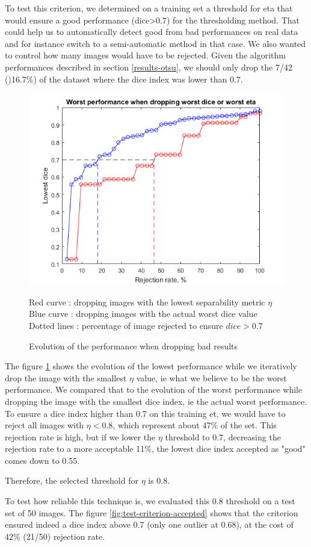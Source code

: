 \documentclass[a4paper,10pt]{article}
\begin{document}
To test this criterion, we determined on a training set a threshold for eta that would ensure a good performance (dice>0.7) for the thresholding method. That could help us to automatically detect good from bad performances on real data and for instance switch to a semi-automatic method in that case. We also wanted to control how many images would have to be rejected. Given the algorithm performances described in section \ref{results-otsu}, we should only drop the 7/42 ()16.7\%) of the dataset where the dice index was lower than 0.7.  
\begin{figure}[h]
	\centering
	\includegraphics[width=0.6\linewidth]{../results/selection-criterion/eta-dice-drop}
	\caption{Evolution of the performance when dropping bad results}{Red curve :  dropping images with the lowest separability metric $\eta$\\ Blue curve : dropping images with the actual worst dice value \\ Dotted lines : percentage of image rejected to ensure $dice > 0.7$}
	\label{fig:eta-dice-drop}
\end{figure}

The figure \ref{fig:eta-dice-drop} shows the evolution of the lowest performance while we iteratively drop the image with the smallest $\eta$ value, ie what we believe to be the worst performance. We compared that to the evolution of the worst performance while dropping the image with the smallest dice index, ie the actual worst performance. To ensure a dice index higher than 0.7 on this training et, we would have to reject all images with $\eta < 0.8$, which represent about 47\% of the set. This rejection rate is high, but if we lower the $\eta$ threshold to 0.7, decreasing the rejection rate to a more acceptable 11\%, the lowest dice index accepted as "good" comes down to 0.55. 

Therefore, the selected threshold for $\eta$ is 0.8.

To test how reliable this technique is, we evaluated this 0.8 threshold on a test set of 50 images. The figure \ref{fig:test-criterion-accepted} shows that the criterion ensured indeed a dice index above 0.7 (only one outlier at 0.68), at the cost of 42\% (21/50) rejection rate.
\end{document}
